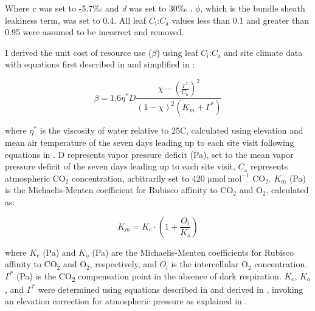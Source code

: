 \noindent Where \textit{c} was set to -5.7‰ and \textit{d} was set to 30‰ . $\phi$, which is the bundle sheath leakiness term, was set to 0.4. All leaf $C_\mathrm{i}$:$C_\mathrm{a}$ values less than 0.1 and greater than 0.95 were assumed to be incorrect and removed.
    
I derived the unit cost of resource use ($\beta$) using leaf $C_\mathrm{i}$:$C_\mathrm{a}$ and site climate data with equations first described in  and simplified in :

\begin{equation}
    \label{eq_4.5}
    \beta = 1.6\eta^{*} D \frac{\chi - (\frac{\Gamma^*}{C_{a}})^{2}}{(1 - \chi)^{2}(K_{m} + \Gamma^{*})}
\end{equation}
    
\noindent where $\eta^{*}$ is the viscosity of water relative to 25\textdegree{}C, calculated using elevation and mean air temperature of the seven days leading up to each site visit following equations in . D represents vapor pressure deficit (Pa), set to the mean vapor pressure deficit of the seven days leading up to each site visit, $C_\mathrm{a}$ represents atmospheric CO$_2$ concentration, arbitrarily set to 420 $\mathrm{\mu mol\ mol^{-1}}$ CO$_2$. $K_\mathrm{m}$ (Pa) is the Michaelis-Menten coefficient for Rubisco affinity to CO$_2$ and O$_2$, calculated as:
    
\begin{equation} \label{eq_4.6}
    K_{m} = K_{c} \cdot \left ( 1 + \frac{O_i}{K_o} \right )
\end{equation}

\noindent where $K_\mathrm{c}$ (Pa) and $K_\mathrm{o}$ (Pa) are the Michaelis-Menten coefficients for Rubisco affinity to CO$_2$ and O$_2$, respectively, and $O_\mathrm{i}$  is the intercellular O$_2$ concentration. $\Gamma^{*}$ (Pa) is the CO\textsubscript{2} compensation point in the absence of dark respiration. $K_\mathrm{c}$, $K_\mathrm{o}$, and $\Gamma^{*}$ were determined using equations described in  and derived in , invoking an elevation correction for atmospheric pressure as explained in .
\clearpage

